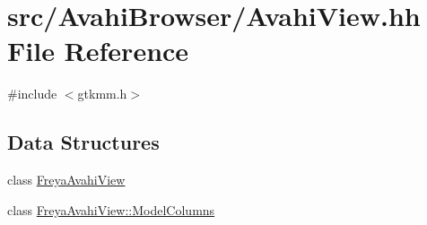 \hypertarget{AvahiView_8hh}{
\section{src/\-Avahi\-Browser/\-Avahi\-View.hh \-File \-Reference}
\label{AvahiView_8hh}
}
{\ttfamily \#include $<$gtkmm.\-h$>$}\*
\subsection*{\-Data \-Structures}
\begin{DoxyCompactItemize}
\item 
class \hyperlink{classFreyaAvahiView}{\-Freya\-Avahi\-View}
\item 
class \hyperlink{classFreyaAvahiView_1_1ModelColumns}{\-Freya\-Avahi\-View\-::\-Model\-Columns}
\end{DoxyCompactItemize}
